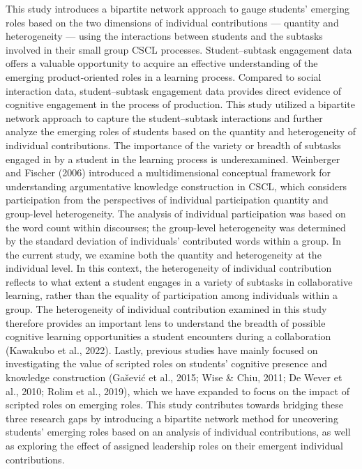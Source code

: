This study introduces a bipartite network approach to gauge students’ emerging roles based on the two dimensions of individual contributions — quantity and heterogeneity — using the interactions between students and the subtasks involved in their small group CSCL processes. Student–subtask engagement data offers a valuable opportunity to acquire an effective understanding of the emerging product-oriented roles in a learning process. Compared to social interaction data, student–subtask engagement data provides direct evidence of cognitive engagement in the process of production. This study utilized a bipartite network approach to capture the student–subtask interactions and further analyze the emerging roles of students based on the quantity and heterogeneity of individual contributions. The importance of the variety or breadth of subtasks engaged in by a student in the learning process is underexamined. Weinberger and Fischer (2006) introduced a multidimensional conceptual framework for understanding argumentative knowledge construction in CSCL, which considers participation from the perspectives of individual participation quantity and group-level heterogeneity. The analysis of individual participation was based on the word count within discourses; the group-level heterogeneity was determined by the standard deviation of individuals’ contributed words within a group. In the current study, we examine both the quantity and heterogeneity at the individual level. In this context, the heterogeneity of individual contribution reflects to what extent a student engages in a variety of subtasks in collaborative learning, rather than the equality of participation among individuals within a group. The heterogeneity of individual contribution examined in this study therefore provides an important lens to understand the breadth of possible cognitive learning opportunities a student encounters during a collaboration (Kawakubo et al., 2022). Lastly, previous studies have mainly focused on investigating the value of scripted roles on students’ cognitive presence and knowledge construction (Gašević et al., 2015; Wise \& Chiu, 2011; De Wever et al., 2010; Rolim et al., 2019), which we have expanded to focus on the impact of scripted roles on emerging roles. This study contributes towards bridging these three research gaps by introducing a bipartite network method for uncovering students’ emerging roles based on an analysis of individual contributions, as well as exploring the effect of assigned leadership roles on their emergent individual contributions.